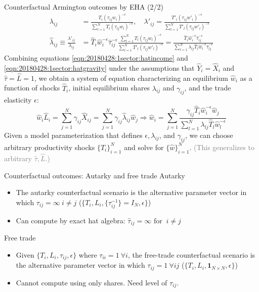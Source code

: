 \documentclass[10pt,notes=hide,aspectratio=169]{beamer}
\begin{document}
\begin{frame}{Counterfactual Armington outcomes by EHA (2/2)}
\begin{align}
\lambda_{ij} 
&=
\frac{T_{i} \left(\tau_{ij}w_i\right)^{-\epsilon}}{\sum_{l=1}^{N} T_{l}  \left(\tau_{lj}w_l\right)^{-\epsilon}},
\quad
\lambda'_{ij} 
=
\frac{T'_{i} \left(\tau_{ij}w'_i\right)^{-\epsilon}}{\sum_{l=1}^{N} T'_{l}  \left(\tau_{lj}w'_l\right)^{-\epsilon}}
\nonumber \\
\hat{\lambda}_{ij}
\equiv 
\frac{\lambda'_{ij}}{\lambda_{ij}}
&=
\hat{T}_{i} \hat{w}_{i}^{-\epsilon} \hat{\tau}_{ij}^{-\epsilon}
\frac{\sum_{l=1}^{N} T_{l}  \left(\tau_{lj}w_l \right)^{-\epsilon}}
	 {\sum_{l=1}^{N} T'_{l} \left(\tau_{lj}w'_l\right)^{-\epsilon}}
=
\frac{\hat{T}_{i} \hat{w}_{i}^{-\epsilon}\hat{\tau}_{ij}^{-\epsilon}}{\sum_{l=1}^{N} \lambda_{lj} \hat{T}_{l} \hat{w}_l^{-\epsilon} \hat{\tau}_{lj}^{-\epsilon}}
\label{eqn:20180428:1sector:hatgravity}
\end{align}
Combining equations \eqref{eqn:20180428:1sector:hatincome} and \eqref{eqn:20180428:1sector:hatgravity}
under the assumptions that $\hat{Y}_{i}=\hat{X}_{i}$ and $\hat{\tau}=\hat{L}=1$, we
obtain a system of equation characterizing an equilibrium $\hat{w}_i$ as a
function of shocks $\hat{T}_i$, initial equilibrium shares $\lambda_{ij}$ and
$\gamma_{ij}$, and the trade elasticity $\epsilon$:
\begin{equation}
\hat{w}_i \hat{L}_i
= 
\sum_{j=1}^{N} \gamma_{ij} \hat{X}_{ij}
=
\sum_{j=1}^{N} \gamma_{ij} \hat{\lambda}_{ij} \hat{w}_{j}
\nonumber 
\Rightarrow
\hat{w}_i
= 
\sum_{j=1}^{N}
\frac{\gamma_{ij} \hat{T}_{i} \hat{w}_{i}^{-\epsilon} \hat{w}_{j} }
{\sum_{l=1}^{N} \lambda_{lj} \hat{T}_{l} \hat{w}_l^{-\epsilon}}
\label{eqn:20180428:1sector:hatequilibriumequations}
\end{equation}
Given a model parameterization that defines $\epsilon, \lambda_{ij}$, and $\gamma_{ij}$,
we can choose arbitrary productivity shocks $\{\hat{T}_{i}\}_{i=1}^{N}$ and solve for $\{\hat{w}\}_{i=1}^{N}$.
\textcolor{gray}{(This generalizes to arbitrary $\hat{\tau},\hat{L}$.)}
\end{frame}
\begin{frame}{Counterfactual outcomes: Autarky and free trade}
Autarky
\begin{itemize}
\item The autarky counterfactual scenario is the alternative parameter vector
in which $\tau_{ij} = \infty \ i \neq j$
($\{T_i,L_i,\{\tau_{ij}^{-1}\}=I_N,\epsilon\}$)
\item Can compute by exact hat algebra: $\hat{\tau}_{ij} = \infty \text{ for } \ i \neq j$
\end{itemize}
Free trade
\begin{itemize}
\item Given $\{T_i,L_i,\tau_{ij},\epsilon\}$ where $\tau_{ii} = 1 \ \forall i$,
the free-trade counterfactual scenario is the alternative parameter vector
in which $\tau_{ij} = 1 \ \forall ij$
($\{T_i,L_i,\mathbf{1}_{N \times N},\epsilon\}$)
\item Cannot compute using only shares. Need level of $\tau_{ij}$.
\end{itemize}
\end{frame}
\end{document}
